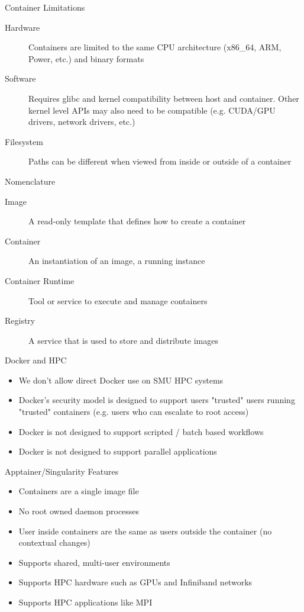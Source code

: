 \begin{frame}{Container Limitations}
\begin{description}
\item[Hardware] Containers are limited to the same CPU architecture
(x86\_64, ARM, Power, etc.) and binary formats
\item[Software] Requires glibc and kernel compatibility between host and
container. Other kernel level APIs may also need to be compatible (e.g.
CUDA/GPU drivers, network drivers, etc.)
\item[Filesystem] Paths can be different when viewed from inside or outside of
a container
\end{description}
\end{frame}

\begin{frame}{Nomenclature}
\begin{description}
\item[Image] A read-only template that defines how to create a container
\item[Container] An instantiation of an image, a running instance
\item[Container Runtime] Tool or service to execute and manage containers
\item[Registry] A service that is used to store and distribute images
\end{description}
\end{frame}

\begin{frame}{Docker and HPC}
\begin{itemize}
\item We don't allow direct Docker use on SMU HPC systems
\item Docker's security model is designed to support users "trusted" users running "trusted" containers (e.g. users who can escalate to root access)
\item Docker is not designed to support scripted / batch based workflows
\item Docker is not designed to support parallel applications
\end{itemize}
\end{frame}

\begin{frame}{Apptainer/Singularity Features}
\begin{itemize}
\item Containers are a single image file
\item No root owned daemon processes
\item User inside containers are the same as users outside the container (no contextual changes)
\item Supports shared, multi-user environments
\item Supports HPC hardware such as GPUs and Infiniband networks
\item Supports HPC applications like MPI
\end{itemize}
\end{frame}

